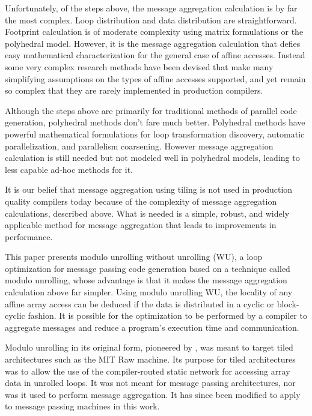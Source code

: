 Unfortunately, of the steps above, the message aggregation calculation is by far the most complex. Loop distribution and data distribution are straightforward. Footprint calculation is of moderate complexity using matrix formulations or the polyhedral model. However, it is the message aggregation calculation that defies easy mathematical characterization for the general case of affine accesses. Instead some very complex research methods \cite{goumas2006message, xue1997communication} have been devised that make many simplifying assumptions on the types of affine accesses supported, and yet remain so complex that they are rarely implemented in production compilers.

Although the steps above are primarily for traditional methods of parallel code generation, polyhedral methods don't fare much better. Polyhedral methods have powerful mathematical formulations for loop transformation discovery, automatic parallelization, and parallelism coarsening. However message aggregation calculation is still needed but not modeled well in polyhedral models, leading to less capable ad-hoc methods for it.

It is our belief that message aggregation using tiling is not used in production quality compilers today because of the complexity of message aggregation calculations, described above. What is needed is a simple, robust, and widely applicable method for message aggregation that leads to improvements in performance. 

This paper presents modulo unrolling without unrolling (WU), a loop optimization for message passing code generation based on a technique called modulo unrolling, whose advantage is that it makes the message aggregation calculation above far simpler. Using modulo unrolling WU, the locality of any affine array access can be deduced if the data is distributed in a cyclic or block-cyclic fashion. It is possible for the optimization to be performed by a compiler to aggregate messages and reduce a program's execution time and communication. 

Modulo unrolling in its original form, pioneered by \cite{barua1999maps}, was meant to target tiled architectures such as the MIT Raw machine. Its purpose for tiled architectures was to allow the use of the compiler-routed static network for accessing array data in unrolled loops. It was not meant for message passing architectures, nor was it used to perform message aggregation. It has since been modified to apply to message passing machines in this work. 

